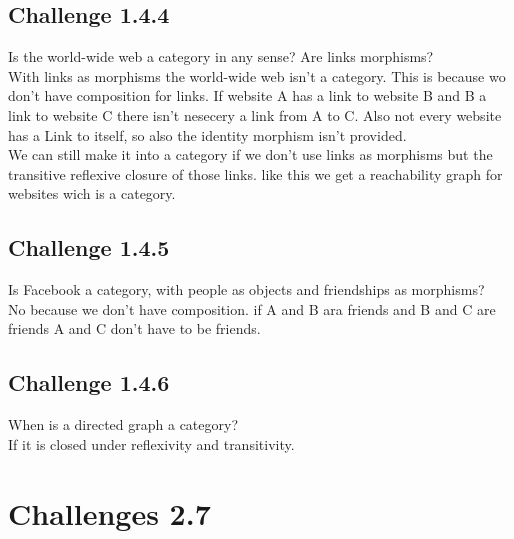 \documentclass[11pt]{article}
\begin{document}
    \subsection*{Challenge 1.4.4}
        Is the world-wide web a category in any sense? Are links morphisms?\\
        With links as morphisms the world-wide web isn't a category. This is because wo don't have composition for links. If website A has a link to website B and B a link to website C there isn't nesecery a link from A to C. Also not every website has a Link to itself, so also the identity morphism isn't provided.\\
        We can still make it into a category if we don't use links as morphisms but the transitive reflexive closure of those links. like this we get a reachability graph for websites wich is a category. 

    \subsection*{Challenge 1.4.5}
        Is Facebook a category, with people as objects and friendships as
        morphisms?\\
        No because we don't have composition. if A and B ara friends and B and C are friends A and C don't have to be friends. 

    \subsection*{Challenge 1.4.6}
        When is a directed graph a category?\\
        If it is closed under reflexivity and transitivity.

\section*{Challenges 2.7}
\end{document}
